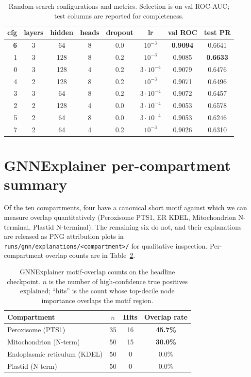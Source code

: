 \documentclass{article}
\begin{document}
\begin{table}[h]
  \caption{Random-search configurations and metrics. Selection is on
  val ROC-AUC; test columns are reported for completeness.}
  \label{tab:sweepfull}
  \centering
  \footnotesize
  \begin{tabular}{rccccccc}
    \toprule
    cfg & layers & hidden & heads & dropout & lr & val ROC & test PR \\
    \midrule
    \textbf{6} & 3 & 64  & 8 & 0.0 & $10^{-3}$    & \textbf{0.9094} & 0.6641 \\
    1          & 3 & 128 & 8 & 0.2 & $10^{-3}$    & 0.9085          & \textbf{0.6633} \\
    0          & 3 & 128 & 4 & 0.2 & $3{\cdot}10^{-4}$ & 0.9079          & 0.6476 \\
    4          & 2 & 128 & 8 & 0.2 & $10^{-3}$    & 0.9071          & 0.6496 \\
    3          & 3 & 64  & 8 & 0.2 & $3{\cdot}10^{-4}$ & 0.9072          & 0.6457 \\
    2          & 2 & 128 & 4 & 0.0 & $3{\cdot}10^{-4}$ & 0.9053          & 0.6578 \\
    5          & 2 & 64  & 8 & 0.0 & $3{\cdot}10^{-4}$ & 0.9053          & 0.6246 \\
    7          & 2 & 64  & 4 & 0.2 & $10^{-3}$    & 0.9026          & 0.6310 \\
    \bottomrule
  \end{tabular}
\end{table}

\section{GNNExplainer per-compartment summary}

Of the ten compartments, four have a canonical short motif against
which we can measure overlap quantitatively (Peroxisome PTS1, ER KDEL,
Mitochondrion N-terminal, Plastid N-terminal). The remaining six do
not, and their explanations are released as PNG attribution plots in
\texttt{runs/gnn/explanations/<compartment>/} for qualitative
inspection. Per-compartment overlap counts are in
Table~\ref{tab:explainer}.

\begin{table}[h]
  \caption{GNNExplainer motif-overlap counts on the headline checkpoint.
  $n$ is the number of high-confidence true positives explained;
  ``hits'' is the count whose top-decile node importance overlaps the
  motif region.}
  \label{tab:explainer}
  \centering
  \footnotesize
  \begin{tabular}{lccc}
    \toprule
    Compartment             & $n$ & Hits & Overlap rate \\
    \midrule
    Peroxisome (PTS1)       & 35  & 16   & \textbf{45.7\%} \\
    Mitochondrion (N-term)  & 50  & 15   & \textbf{30.0\%} \\
    Endoplasmic reticulum (KDEL)  & 50 & 0 & 0.0\% \\
    Plastid (N-term)        & 50  & 0    & 0.0\% \\
    \bottomrule
  \end{tabular}
\end{table}

% 
\end{document}
